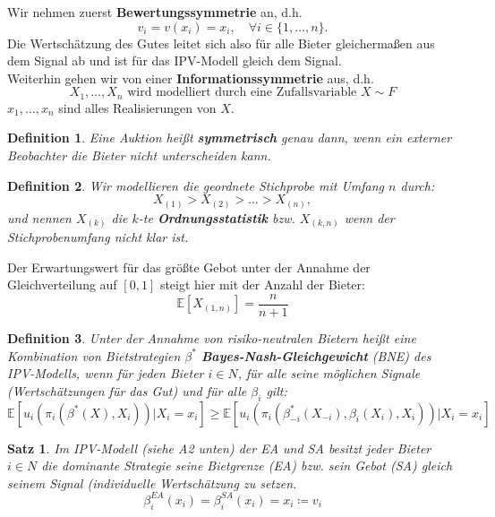 \documentclass[12pt]{extreport} %
\theoremstyle{named}
\theoremstyle{nnamed}
\theoremstyle{itshape}
\newtheorem{satz}[unnamedtheorem]{Satz}
\newtheorem*{definition}{Definition}
\theoremstyle{normal}
\begin{document}
	Wir nehmen zuerst \textbf{Bewertungssymmetrie} an, d.h.
	$$ v_{i} = v(x_{i}) = x_{i}, \quad \forall i \in \{1, \dotsc, n\}. $$
	Die Wertschätzung des Gutes leitet sich also für alle Bieter gleichermaßen aus dem Signal ab und ist für das IPV-Modell gleich dem Signal. \\
	
	Weiterhin gehen wir von einer \textbf{Informationssymmetrie} aus, d.h.
	$$ X_{1}, \dotsc, X_{n} \text{ wird modelliert durch eine Zufallsvariable } X \sim F $$
	$x_{1}, \dotsc, x_{n}$ sind alles Realisierungen von $X$.

 
\begin{definition}
	Eine Auktion heißt \textbf{symmetrisch} genau dann, wenn ein externer Beobachter die Bieter nicht unterscheiden kann.
\end{definition}

\begin{definition}
	Wir modellieren die geordnete Stichprobe mit Umfang $n$ durch:
		$$ X_{(1)} > X_{(2)} > \dotsc > X_{(n)}, $$
		und nennen $X_{(k)}$ die $k$-te \textbf{Ordnungsstatistik} bzw. $X_{(k, n)}$ wenn der Stichprobenumfang nicht klar ist.
\end{definition}

Der Erwartungswert für das größte Gebot unter der Annahme der Gleichverteilung auf $[0, 1]$ steigt hier mit der Anzahl der Bieter:
	$$ \mathbb{E}[X_{(1,n)}] = \frac{n}{n+1} $$

\begin{definition}
	Unter der Annahme von risiko-neutralen Bietern heißt eine Kombination von Bietstrategien $\beta^{*}$ \textbf{Bayes-Nash-Gleichgewicht} (BNE) des IPV-Modells, wenn für jeden Bieter $i \in N$, für alle seine möglichen Signale (Wertschätzungen für das Gut) und für alle $\beta_{i}$ gilt:
	$$ \mathbb{E}\left[u_{i}\left(\pi_{i}\left(\beta^{*}(X), X_{i}\right) \right) \big| X_{i} = x_{i}\right] \geq \mathbb{E}\left[u_{i}\left(\pi_{i}\left(\beta_{-i}^{*}(X_{-i}), \beta_{i}(X_{i}), X_{i}\right) \right) \big| X_{i} = x_{i}\right] $$
\end{definition}


\begin{satz}
	Im IPV-Modell (siehe A2 unten) der EA und SA besitzt jeder Bieter $i \in N$ die dominante Strategie seine Bietgrenze (EA) bzw. sein Gebot (SA) gleich seinem Signal (individuelle Wertschätzung zu setzen.
	$$ \beta_{i}^{EA}(x_{i}) = \beta_{i}^{SA}(x_{i}) = x_{i} \coloneqq v_{i} $$
\end{satz}
\end{document}

